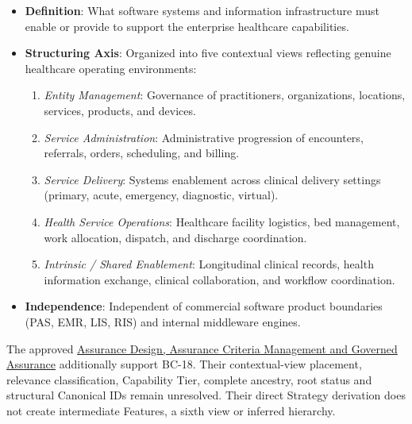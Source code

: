 \begin{itemize}

\item 
\textbf{Definition}: What software systems and information infrastructure must enable or provide to support the enterprise healthcare capabilities.



\item 
\textbf{Structuring Axis}: Organized into five contextual views reflecting genuine healthcare operating environments:


\begin{enumerate}

\item 
\emph{Entity Management}: Governance of practitioners, organizations, locations, services, products, and devices.



\item 
\emph{Service Administration}: Administrative progression of encounters, referrals, orders, scheduling, and billing.



\item 
\emph{Service Delivery}: Systems enablement across clinical delivery settings (primary, acute, emergency, diagnostic, virtual).



\item 
\emph{Health Service Operations}: Healthcare facility logistics, bed management, work allocation, dispatch, and discharge coordination.



\item 
\emph{Intrinsic /\allowbreak{} Shared Enablement}: Longitudinal clinical records, health information exchange, clinical collaboration, and workflow coordination.



\end{enumerate}


\item 
\textbf{Independence}: Independent of commercial software product boundaries (PAS, EMR, LIS, RIS) and internal middleware engines.



\end{itemize}
\label{rad:tier-model:118}

The approved \hyperref[rad:enabling:674]{Assurance Design, Assurance Criteria Management and Governed Assurance} additionally support BC-18. Their contextual-view placement, relevance classification, Capability Tier, complete ancestry, root status and structural Canonical IDs remain unresolved. Their direct Strategy derivation does not create intermediate Features, a sixth view or inferred hierarchy.

